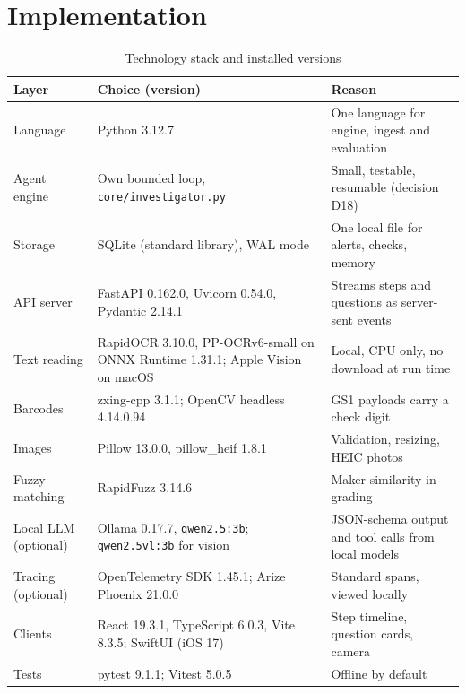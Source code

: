 \section{Implementation}

\begin{table}[H]
\centering
\caption{Technology stack and installed versions}
\label{tab:stack}
\footnotesize
\begin{tabularx}{\linewidth}{@{}>{\raggedright\arraybackslash}p{2.6cm} >{\raggedright\arraybackslash}p{5.2cm} >{\raggedright\arraybackslash}X@{}}
\toprule
\textbf{Layer} & \textbf{Choice (version)} & \textbf{Reason} \\ \midrule
Language & Python 3.12.7 & One language for engine, ingest and evaluation \\
Agent engine & Own bounded loop, \texttt{core/investigator.py} & Small, testable, resumable (decision D18) \\
Storage & SQLite (standard library), WAL mode & One local file for alerts, checks, memory \\
API server & FastAPI 0.162.0, Uvicorn 0.54.0, Pydantic 2.14.1 & Streams steps and questions as server-sent events \\
Text reading & RapidOCR 3.10.0, PP-OCRv6-small on ONNX Runtime 1.31.1; Apple Vision on macOS & Local, CPU only, no download at run time \cite{rapidai2021rapidocr,du2020ppocr} \\
Barcodes & zxing-cpp 3.1.1; OpenCV headless 4.14.0.94 & GS1 payloads carry a check digit \\
Images & Pillow 13.0.0, pillow\_heif 1.8.1 & Validation, resizing, HEIC photos \\
Fuzzy matching & RapidFuzz 3.14.6 & Maker similarity in grading \\
Local LLM (optional) & Ollama 0.17.7, \texttt{qwen2.5:3b}; \texttt{qwen2.5vl:3b} for vision & JSON-schema output and tool calls from local models \cite{ollama2026structured} \\
Tracing (optional) & OpenTelemetry SDK 1.45.1; Arize Phoenix 21.0.0 & Standard spans, viewed locally \cite{otel2026genai,arize2026openinference} \\
Clients & React 19.3.1, TypeScript 6.0.3, Vite 8.3.5; SwiftUI (iOS 17) & Step timeline, question cards, camera \\
Tests & pytest 9.1.1; Vitest 5.0.5 & Offline by default \\
\bottomrule
\end{tabularx}
\end{table}

